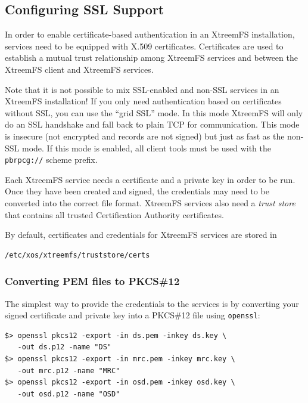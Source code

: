 \documentclass[a4paper,10pt]{book}
\begin{document}
\subsection{Configuring SSL Support}
\label{sec:cfg_ssl}

In order to enable certificate-based authentication in an XtreemFS installation, services need to be equipped with X.509 certificates. Certificates are used to establish a mutual trust relationship among XtreemFS services and between the XtreemFS client and XtreemFS services.

Note that it is not possible to mix SSL-enabled and non-SSL services in an XtreemFS installation! If you only need authentication based on certificates without SSL, you can use the ``grid SSL'' mode. In this mode XtreemFS will only do an SSL handshake and fall back to plain TCP for communication. This mode is insecure (not encrypted and records are not signed) but just as fast as the non-SSL mode. If this mode is enabled, all client tools must be used with the \texttt{pbrpcg://} scheme prefix.

Each XtreemFS service needs a certificate and a private key in order to be run. Once they have been created and signed, the credentials may need to be converted into the correct file format. XtreemFS services also need a \textit{trust store} that contains all trusted Certification Authority certificates.

By default, certificates and credentials for XtreemFS services are stored in
\begin{verbatim}
/etc/xos/xtreemfs/truststore/certs
\end{verbatim}


\subsubsection{Converting PEM files to PKCS\#12}
The simplest way to provide the credentials to the services is by converting your signed certificate and private key into a PKCS\#12 file using \texttt{openssl}:


\begin{verbatim}
$> openssl pkcs12 -export -in ds.pem -inkey ds.key \
   -out ds.p12 -name "DS"
$> openssl pkcs12 -export -in mrc.pem -inkey mrc.key \
   -out mrc.p12 -name "MRC"
$> openssl pkcs12 -export -in osd.pem -inkey osd.key \
   -out osd.p12 -name "OSD"
\end{verbatim}
\end{document}
